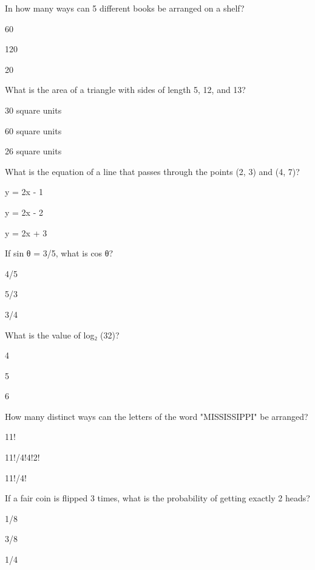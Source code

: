 \begin{enhancedmcq}{In how many ways can 5 different books be arranged on a shelf?}
\item 60
\item 120
\item 20

\end{enhancedmcq}
\begin{enhancedmcq}{What is the area of a triangle with sides of length 5, 12, and 13?}
\item 30 square units
\item 60 square units
\item 26 square units

\end{enhancedmcq}
\begin{enhancedmcq}{What is the equation of a line that passes through the points (2, 3) and (4, 7)?}
\item y = 2x - 1
\item y = 2x - 2
\item y = 2x + 3

\end{enhancedmcq}
\begin{enhancedmcq}{If sin θ = 3/5, what is cos θ?}
\item 4/5
\item 5/3
\item 3/4

\end{enhancedmcq}
\begin{enhancedmcq}{What is the value of log₂ (32)?}
\item 4
\item 5
\item 6

\end{enhancedmcq}
\begin{enhancedmcq}{How many distinct ways can the letters of the word "MISSISSIPPI" be arranged?}
\item 11!
\item 11!/4!4!2!
\item 11!/4!

\end{enhancedmcq}
\begin{enhancedmcq}{If a fair coin is flipped 3 times, what is the probability of getting exactly 2 heads?}
\item 1/8
\item 3/8
\item 1/4

\end{enhancedmcq}
